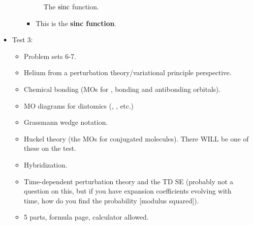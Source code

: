 \documentclass[../notes.tex]{subfiles}
\begin{document}
\begin{itemize}
\begin{itemize}
\begin{figure}[H]
            \caption{The $\operatorname{sinc}$ function.}
            \label{fig:sincFunction}
        \end{figure}
        \begin{itemize}
            \item This is the \textbf{sinc function}.
        \end{itemize}
    \end{itemize}
    \item Test 3:
    \begin{itemize}
        \item Problem sets 6-7.
        \item Helium from a perturbation theory/variational principle perspective.
        \item Chemical bonding (MOs for , bonding and antibonding orbitals).
        \item MO diagrams for diatomics (, , etc.)
        \item Grassmann wedge notation.
        \item Huckel theory (the MOs for conjugated molecules). There WILL be one of these on the test.
        \item Hybridization.
        \item Time-dependent perturbation theory and the TD SE (probably not a question on this, but if you have expansion coefficients evolving with time, how do you find the probability [modulus squared]).
        \item 5 parts, formula page, calculator allowed.
    \end{itemize}
\end{itemize}
\end{document}
